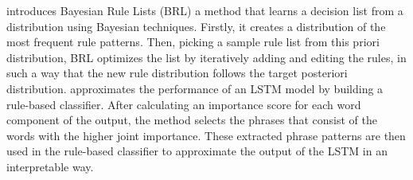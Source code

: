 \documentclass[journal]{IEEEtran}
\begin{document}
\cite{Letham2015} introduces Bayesian Rule Lists (BRL) a method that learns a decision list from a distribution using Bayesian techniques. Firstly, it creates a distribution of the most frequent rule patterns. Then, picking a sample rule list from this priori distribution, BRL optimizes the list by iteratively adding and editing the rules, in such a way that the new rule distribution follows the target posteriori distribution. 
\cite{Murdoch2017} approximates the performance of an LSTM model by building a rule-based classifier. After calculating an importance score for each word component of the output, the method selects the phrases that consist of the words with the higher joint importance. These extracted phrase patterns are then used in the rule-based classifier to approximate the output of the LSTM in an interpretable way.
\end{document}
